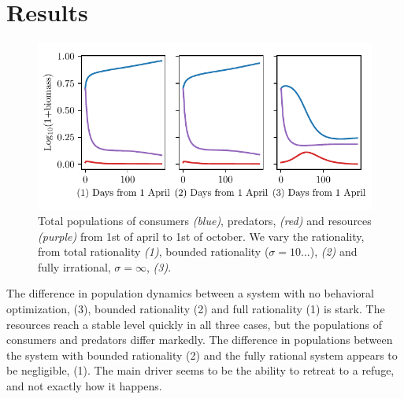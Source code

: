 \section{Results}


\begin{figure}[H]
\includegraphics{plots/populations.pdf}
\caption{Total populations of consumers \emph{(blue)}, predators, \emph{(red)} and resources \emph{(purple)} from 1st of april to 1st of october. We vary the rationality, from total rationality \emph{(1)}, bounded rationality ($\sigma = 10...$), \emph{(2)} and fully irrational, $\sigma = \infty$, \emph{(3)}.}
\label{fig:long_term_populations}
\end{figure}
The difference in population dynamics between a system with no behavioral optimization, (3), bounded rationality (2) and full rationality (1) is stark. The resources reach a stable level quickly in all three cases, but the populations of consumers and predators differ markedly. The difference in populations between the system with bounded rationality (2) and the fully rational system appears to be negligible, (1). The main driver seems to be the ability to retreat to a refuge, and not exactly how it happens.
